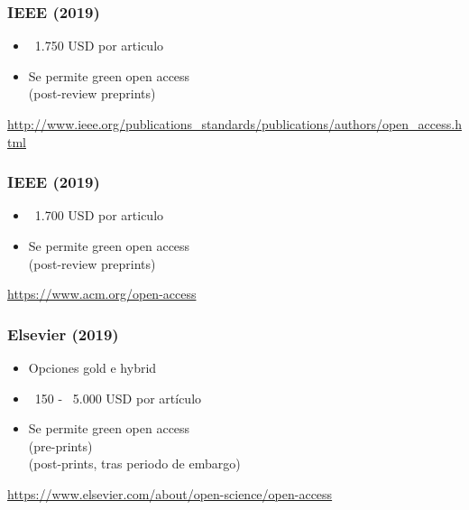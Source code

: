 \documentclass[17pt,aspectratio=169]{beamer}
\begin{document}
\begin{frame}
\frametitle{IEEE (2019)}

\begin{itemize}
\item ~1.750 USD por articulo
\item Se permite green open access \\
  (post-review preprints) \\
\end{itemize}

\begin{flushright}
{\footnotesize \url{http://www.ieee.org/publications_standards/publications/authors/open_access.html}}
\end{flushright}

\end{frame}

\begin{frame}
\frametitle{IEEE (2019)}

\begin{itemize}
\item ~1.700 USD por articulo
\item Se permite green open access \\
  (post-review preprints) \\
\end{itemize}

\begin{flushright}
{\footnotesize \url{https://www.acm.org/open-access}}
\end{flushright}

\end{frame}

\begin{frame}
\frametitle{Elsevier (2019)}

\begin{itemize}
\item Opciones gold e hybrid
\item ~150 - ~5.000 USD por artículo
\item Se permite green open access \\
  (pre-prints) \\
  (post-prints, tras periodo de embargo) \\
\end{itemize}

\begin{flushright}
{\footnotesize \url{https://www.elsevier.com/about/open-science/open-access}}
\end{flushright}

\end{frame}
\end{document}
